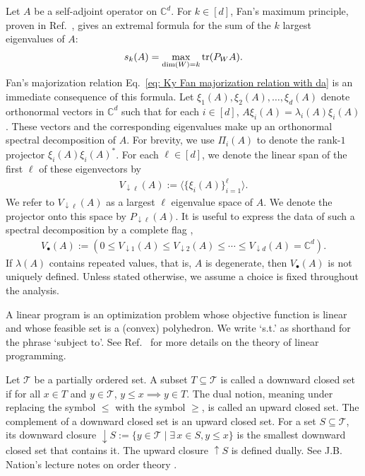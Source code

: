 \documentclass[12pt]{article}
\theoremstyle{definition}
\numberwithin{equation}{section}
\numberwithin{equation}{section}
\newcommand{\la}{\lambda}
\newcommand{\da}{\downarrow}
\newcommand{\ua}{\uparrow}
\newcommand{\cT}{\mathcal{T}}
\newcommand{\bC}{\mathbb{C}}
\begin{document}
Let \(A\) be a self-adjoint operator on \(\bC^d\). For \(k \in [d]\), Fan's maximum principle, proven in Ref.~\cite{Fan1949}, gives an extremal formula for the sum of the \(k\) largest eigenvalues of \(A\):
\begin{align}
\label{eq: Ky Fan maximum principle}
 s_k(A) =  \max_{\dim(W)=k}  \tr(P_W A).
\end{align}
Fan's majorization relation Eq.~\ref{eq: Ky Fan majorization relation with da} is an immediate consequence of this formula. Let  \(\xi_1 (A), \xi_2 (A),\ldots, \xi_d (A)\) denote orthonormal vectors in \(\bC^d\) such that for each \(i \in [d]\), \(A \xi_i (A) = \la_i (A) \xi_i (A)\). These vectors and the corresponding eigenvalues make up an orthonormal spectral decomposition of \(A\). For brevity, we use \(\Pi_i (A)\) to denote the rank-\(1\) projector \(\xi_i (A) \xi_i (A)^*\). For each \(\ell \in [d]\), we denote the linear span of the first \(\ell\) of these eigenvectors by
\begin{align}
    V_{\da \ell} (A) := \langle \{\xi_i (A)\}_{i=1}^\ell \rangle.
\end{align}
We refer to \(V_{\da \ell} (A)\) as a largest \(\ell\) eigenvalue space of 
\(A\). We denote the projector onto this space by \(P_{\da \ell} (A)\). It is useful to express the data of such a spectral decomposition by a complete flag \cite{Gillespie2019},
\begin{align}
\label{eq: subspace flag}
V_{\bullet} (A) := (0 \leq V_{\da 1} (A) \leq V_{\da 2} (A) \leq \cdots \leq V_{\da d} (A) = \bC^d).
\end{align}
If \(\la(A)\) contains repeated values, that is, \(A\) is degenerate, then \(V_{\bullet} (A)\) is not uniquely defined. Unless stated otherwise, we assume a choice is fixed throughout the analysis. 




A linear program is an optimization problem whose objective function is linear and whose feasible set is a (convex) polyhedron. We write `s.t.' as shorthand for the phrase `subject to'.  See Ref.~\cite{Schrijver1998} for more details on the theory of linear programming. 



Let \(\cT\) be a partially ordered set. A subset \(T \subseteq \mathcal{T}\) is called a downward closed set if for all \(x \in T\) and \(y \in \mathcal{T}\), \(y \leq x \implies y \in T.\) The dual notion, meaning under replacing the symbol \(\leq\) with the symbol \(\geq\), is called an upward closed set. The complement of a downward closed set is an upward closed set. For a set \(S \subseteq \mathcal{T}\), its downward closure \(\da S := \{ y \in \mathcal{T} \mid \exists \, x \in S, y \leq x\}\) is the smallest downward closed set that contains it. The upward closure \(\ua S\) is defined dually. See J.B. Nation's lecture notes on order theory \cite{Nation2017}. 
\end{document}
